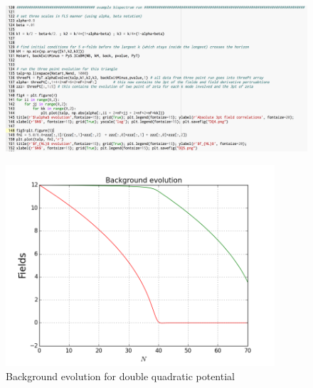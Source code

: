 \documentclass[10pt,
amsmath,amssymb,
aps,prd,nofootinbib,eqsecnum,a4paper]{revtex4}
\begin{document}
\begin{figure}[H]
\includegraphics[width=17cm]{Shot5}
\end{figure}



\begin{figure}
\centering
\includegraphics[width=10cm]{DQ1}
\caption{\label{double1}
Background evolution for double quadratic potential}\label{shot3}
\end{figure}
\end{document}
